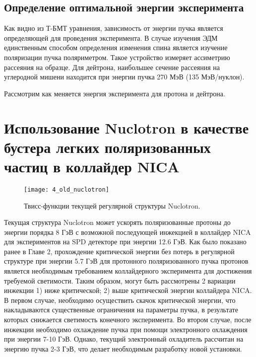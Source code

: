 	\subsection{Определение оптимальной энергии эксперимента}\label{sec:EDM/requirements/energy}
\par Как видно из Т-БМТ уравнения, зависимость от энергии пучка является определяющей для проведения эксперимента. В случае изучения ЭДМ единственным способом определения изменения спина является изучение поляризации пучка поляриметром. Такое устройство измеряет ассиметрию рассеяния на образце. Для дейтрона, наибольшее сечение рассеяния на углеродной мишени находится при энергии пучка 270 МэВ (135 МэВ/нуклон).

\par Рассмотрим как меняется энергия эксперимента для протона и дейтрона. 
	
	\section{Использование Nuclotron в качестве бустера легких поляризованных частиц в коллайдер NICA}\label{sec:EDM/nuclotron}
	
\begin{figure}[!h]
  \centering
	\texttt{[image: 4\_old\_nuclotron]}
   \caption{Твисс-функции текущей регулярной структуры Nuclotron.}
   \label{fig:4_old_nuclotron}
\end{figure}

\par Текущая структура Nuclotron может ускорять поляризованные протоны до энергии порядка 8 ГэВ с возможной последующей инжекцией в коллайдер NICA для экспериментов на SPD детекторе при энергии 12.6 ГэВ. Как было показано ранее в Главе 2, прохождение критической энергии без потерь в регулярной структуре при энергии 5.7 ГэВ для протонного поляризованного пучка протонов является необходимым требованием коллайдерного эксперимента для достижения требуемой светимости. Таким образом, могут быть рассмотрены 2 вариации инжекции 1) ниже критической; 2) выше критической энергии коллайдера NICA. В первом случае, необходимо осуществить скачок критической энергии, что накладываются существенные ограничения на параметры пучка, в результате которых снижается светимость конечного эксперимента. Во втором случае, после инжекции необходимо охлаждение пучка при помощи электронного охлаждения при энергии 7-10 ГэВ. Однако, текущий электронный охладитель рассчитан на энергию пучка 2-3 ГэВ, что делает необходимым разработку новой установки.

